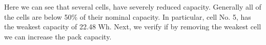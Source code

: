 \documentclass[10pt,twocolumn]{IEEEtran}
\begin{document}
Here we can see that several cells, have severely reduced capacity. 
Generally all of the cells are below 50\%  of their nominal capacity.
In particular, cell No. 5, has the weakest capacity of 22.48 Wh. 
Next, we verify if by removing the weakest cell we can increase the pack capacity.


%
%
  
\end{document}
